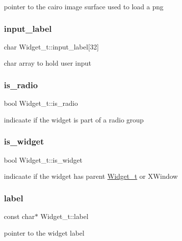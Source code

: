 pointer to the cairo image surface used to load a png \mbox{\label{structWidget__t_ac5cb454301472edeb16e563ef2149dbb}} 
\subsubsection{\texorpdfstring{input\+\_\+label}{input\_label}}
{\footnotesize\ttfamily char Widget\+\_\+t\+::input\+\_\+label\mbox{[}32\mbox{]}}

char array to hold user input \mbox{\label{structWidget__t_acb0bba70f001420ed9a33128c10e74ed}} 
\subsubsection{\texorpdfstring{is\+\_\+radio}{is\_radio}}
{\footnotesize\ttfamily bool Widget\+\_\+t\+::is\+\_\+radio}

indicaate if the widget is part of a radio group \mbox{\label{structWidget__t_aff0b7ecbf87b995342d13e2efe79dfca}} 
\subsubsection{\texorpdfstring{is\+\_\+widget}{is\_widget}}
{\footnotesize\ttfamily bool Widget\+\_\+t\+::is\+\_\+widget}

indicaate if the widget has parent \hyperlink{structWidget__t}{Widget\+\_\+t} or X\+Window \mbox{\label{structWidget__t_a952020107ac1f6d9a37b4f978f77b61c}} 
\subsubsection{\texorpdfstring{label}{label}}
{\footnotesize\ttfamily const char$\ast$ Widget\+\_\+t\+::label}

pointer to the widget label \mbox{\label{structWidget__t_a483f6517c19fe09e1bf2eaec6646a14b}} 
